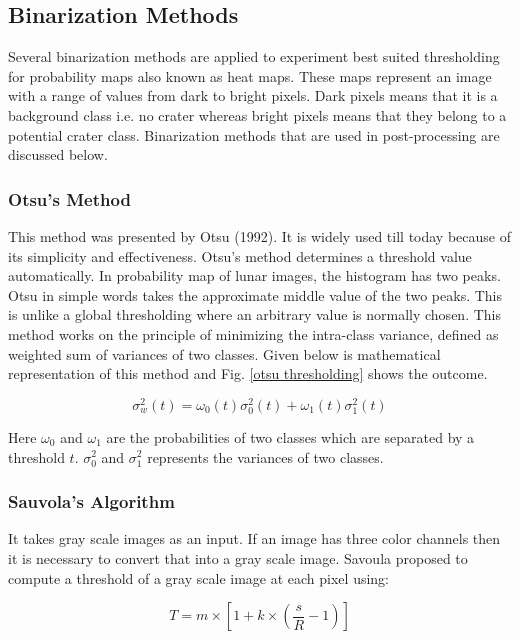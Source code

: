 \documentclass[11pt]{article}
\begin{document}
\subsection{Binarization Methods}
Several binarization methods are applied to experiment best suited thresholding for probability maps also known as heat maps. These maps represent an image with a range of values from dark to bright pixels. Dark pixels means that it is a background class i.e. no crater whereas bright pixels means that they belong to a potential crater class. Binarization methods that are used in post-processing are discussed below.

\subsubsection{Otsu's Method}
This method was presented by Otsu (1992). It is widely used till today because of its simplicity and effectiveness. Otsu's method determines a threshold value automatically. In probability map of lunar images, the histogram has two peaks. Otsu in simple words takes the approximate middle value of the two peaks. This is unlike a global thresholding where an arbitrary value is normally chosen. This method works on the principle of minimizing the intra-class variance, defined as weighted sum of variances of two classes. Given below is mathematical representation of this method and Fig. \ref{otsu thresholding} shows the outcome.

\begin{equation}
\sigma_{w}^{2}(t)=\omega_{0}(t) \sigma_{0}^{2}(t)+\omega_{1}(t) \sigma_{1}^{2}(t)
\end{equation}

Here $\omega_{0}$ and $\omega_{1}$ are the probabilities of two classes which are separated by a threshold $t$. $\sigma_{0}^{2}$ and $\sigma_{1}^{2}$ represents the variances of two classes.

\subsubsection{Sauvola's Algorithm}
It takes gray scale images as an input. If an image has three color channels then it is necessary to convert that into a gray scale image. Savoula proposed to compute a threshold of a gray scale image at each pixel using:

\begin{equation}
T=m \times\left[1+k \times\left(\frac{s}{R}-1\right)\right]
\end{equation}
\end{document}
